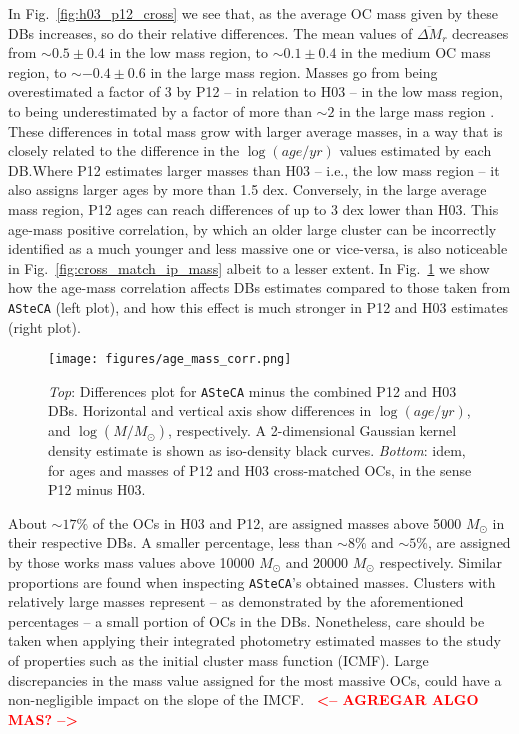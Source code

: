 \documentclass[a4paper,fleqn,usenatbib]{mnras}
\newcommand{\cmmt}[1]{\textcolor{red}{\textbf{$\;\;$<-- #1 -->$\;\;$}}}
\begin{document}
In Fig.~\ref{fig:h03_p12_cross} we see that, as the average OC mass given by
these DBs increases, so do their relative differences.
The mean values of $\overline{\Delta M}_r$ decreases from ${\sim}0.5\pm0.4$ in
the low mass region, to ${\sim}0.1\pm0.4$ in the medium OC mass region, to
${\sim-}0.4\pm0.6$ in the large mass region. Masses go from being overestimated
a factor of 3 by P12 -- in relation to H03 -- in the low mass region, to being
underestimated by a factor of more than ${\sim}2$ in the large mass region .
%
These differences in total mass grow with larger average masses, in a way that
is closely related to the difference in the $\log(age/yr)$ values estimated by
each DB.\@ Where P12 estimates larger masses than H03 -- i.e., the low mass
region -- it also assigns larger ages by more than 1.5 dex. Conversely, in the
large average mass region, P12 ages can reach differences of up to 3 dex lower
than H03.
%
This age-mass positive correlation, by which an older large cluster can be
incorrectly identified as a much younger and less massive one or vice-versa, is
also noticeable in Fig.~\ref{fig:cross_match_ip_mass} albeit to a lesser
extent. In Fig.~\ref{fig:age_mass_corr} we show how the age-mass correlation
affects DBs estimates compared to those taken from \texttt{ASteCA} (left plot),
and how this effect is much stronger in P12 and H03 estimates (right plot).

\begin{figure}
\texttt{[image: figures/age\_mass\_corr.png]}
\caption{\emph{Top}: Differences plot for \texttt{ASteCA} minus the combined P12
and H03 DBs. Horizontal and vertical axis show differences in
$\log(age/yr)$, and $\log(M/M_{\odot})$, respectively.
A 2-dimensional Gaussian kernel density estimate is shown as iso-density black
curves.
\emph{Bottom}: idem, for ages and masses of P12 and H03 cross-matched OCs, in
the sense P12 minus H03.}
\label{fig:age_mass_corr}
\end{figure}

About ${\sim}17\%$ of the OCs in H03 and P12, are assigned masses
above 5000 $M_{\odot}$ in their respective DBs. A smaller percentage,
less than ${\sim}8\%$ and ${\sim}5\%$, are assigned by those works mass values
above 10000 $M_{\odot}$ and 20000 $M_{\odot}$ respectively. Similar proportions
are found when inspecting \texttt{ASteCA}'s obtained masses.
%
Clusters with relatively large masses represent -- as demonstrated by
the aforementioned percentages -- a small portion of OCs in the DBs.
Nonetheless, care should be taken when applying their integrated photometry
estimated masses to the study of properties such as the initial cluster
mass function (ICMF).
Large discrepancies in the mass value assigned for the most massive OCs, could
have a non-negligible impact on the slope of the IMCF.\@
\cmmt{AGREGAR ALGO MAS?}
\end{document}
